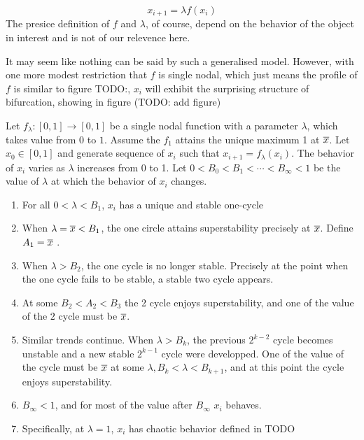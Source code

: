 \begin{equation}
	x_{i+1}=\lambda f(x_i)
\end{equation}
The presice definition of $f$ and $\lambda$, of course, depend on the behavior of the object in interest and is not of our relevence here.

It may seem like nothing can be said by such a generalised model. However, with one more modest restriction that $f$ is single nodal, which just means the profile of $f$ is similar to figure TODO:, $x_i$ will exhibit the surprising structure of bifurcation, showing in figure (TODO: add figure)

\begin{thm}[Bifurcation]\label{th:general_bifurcation}
	Let $f_{\lambda}: [0,1] \rightarrow [0,1] $ be a single nodal function with a parameter $\lambda$, which takes value from $0$ to $1$. 
	Assume the $f_{1}$ attains the unique maximum 1 at $\overline{x}$.
	Let $x_0 \in [0,1]$ and generate sequence of $x_i$ such that $x_{i+1} = f_{\lambda}(x_i)$.
	The behavior of $x_i$ varies as $\lambda$ increases from 0 to 1. Let $0 < B_0 < B_1 < \cdots < B_{\infty} < 1$ be the value of $\lambda$ at which the behavior of $x_i$ changes.

	\begin{enumerate}
		\item For all $0 <\lambda < B_1$, $x_i$ has a unique and stable one-cycle
		\item When $\lambda = \overline{x} < B_1$, the one circle attains superstability precisely at $\overline{x}$. Define $A_1 = \overline{x}$ .
		\item When $\lambda > B_2$, the one cycle is no longer stable. Precisely at the point when the one cycle fails to be stable, a stable two cycle appears.
		\item At some $B_2 <A_2 < B_3$ the 2 cycle enjoys superstability, and one of the value of the $2$ cycle must be $\overline{x}$.
		\item Similar trends continue. When $\lambda > B_k$, the previous $2^{k-2}$ cycle becomes unstable and a new stable $2^{k-1}$ cycle were developped. One of the value of the cycle must be $\overline{x}$ at some $\lambda, B_k <\lambda < B_{k+1}$, and at this point the cycle enjoys superstability.
		\item $B_{\infty} < 1$, and for most of the value after $B_{\infty}$ $x_i$ behaves. 
		\item Specifically, at $\lambda = 1$, $x_i$ has chaotic behavior defined in TODO
	\end{enumerate}

\end{thm}


